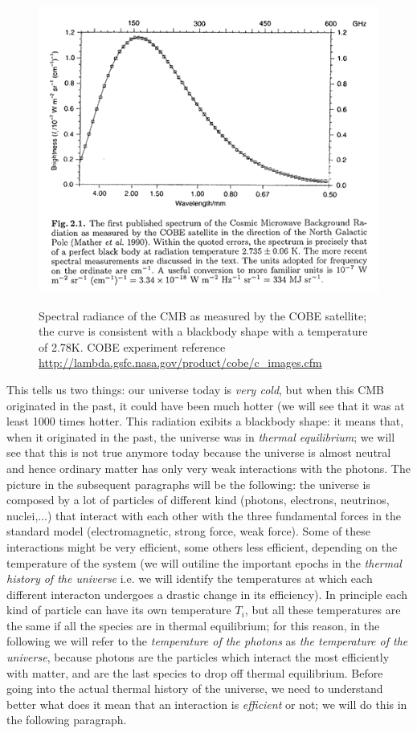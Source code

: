 \documentclass[11pt, a4paper,oneside,openright]{book}
\numberwithin{equation}{section}
\begin{document}
\begin{figure}
\begin{center}
\includegraphics[scale=0.7]{Draw/cmbrad.png}
\label{}
\end{center}
\caption{Spectral radiance of the CMB as measured by the COBE satellite; the curve is consistent with a blackbody shape with a temperature of 2.78K. COBE experiment reference \url{http://lambda.gsfc.nasa.gov/product/cobe/c_images.cfm}}
\label{cmbspectral}
\end{figure}
This tells us two things: our universe today is \textit{very cold}, but when this CMB originated in the past, it could have been much hotter (we will see that it was at least 1000 times hotter. This radiation exibits a blackbody shape: it means that, when it originated in the past, the universe was in \textit{thermal equilibrium}; we will see that this is not true anymore today because the universe is almost neutral and hence ordinary matter has only very weak interactions with the photons. The picture in the subsequent paragraphs will be the following: the universe is composed by a lot of particles of different kind (photons, electrons, neutrinos, nuclei,...) that interact with each other with the three fundamental forces in the standard model (electromagnetic, strong force, weak force). Some of these interactions might be very efficient, some others less efficient, depending on the temperature of the system (we will outiline the important epochs in the \textit{thermal history of the universe} i.e. we will 
identify the temperatures at which each different interacton undergoes a drastic change in its efficiency). In principle each kind of particle can have its own temperature $T_i$, but all these temperatures are the same if all the species are in thermal equilibrium; for this reason, in the following we will refer to the \textit{temperature of the photons} as \textit{the temperature of the universe}, because photons are the particles which interact the most efficiently with matter, and are the last species to drop off thermal equilibrium. Before going into the actual thermal history of the universe, we need to understand better what does it mean that an interaction is \textit{efficient} or not; we will do this in the following paragraph. 
\end{document}
